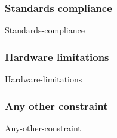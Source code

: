 \subsubsection{Standards compliance}
{Standards-compliance}

\subsubsection{Hardware	limitations}
{Hardware-limitations}

\subsubsection{Any other constraint}
{Any-other-constraint}